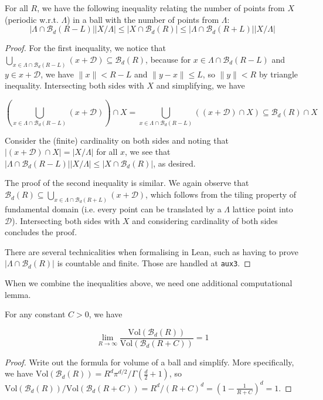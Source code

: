 \begin{lemma}\label{lemma:periodic-points-bounds}\leanok
  For all $R$, we have the following inequality relating the number of points from $X$ (periodic w.r.t. $\Lambda$) in a ball with the number of points from $\Lambda$:
  \[
    \left|\Lambda \cap \mathcal{B}_d(R - L)\right|\left|X / \Lambda\right|
    \leq \left|X \cap \mathcal{B}_d(R)\right|
    \leq \left|\Lambda \cap \mathcal{B}_d(R + L)\right|\left|X / \Lambda\right|
  \]
\end{lemma}
\begin{proof}\leanok
  For the first inequality, we notice that $\bigcup_{x \in \Lambda \cap \mathcal{B}_d(R - L)} (x + \mathcal{D}) \subseteq \mathcal{B}_d(R)$, because for $x \in \Lambda \cap \mathcal{B}_d(R - L)$ and $y \in x + \mathcal{D}$, we have $\|x\| < R - L$ and $\|y - x\| \leq L$, so $\|y\| < R$ by triangle inequality. Intersecting both sides with $X$ and simplifying, we have

  \[
    \left(\bigcup_{x \in \Lambda \cap \mathcal{B}_d(R - L)} (x + \mathcal{D})\right) \cap X = \bigcup_{x \in \Lambda \cap \mathcal{B}_d(R - L)} ((x + \mathcal{D}) \cap X) \subseteq \mathcal{B}_d(R) \cap X
  \]

  Consider the (finite) cardinality on both sides and noting that $|(x + \mathcal{D}) \cap X| = |X / \Lambda|$ for all $x$, we see that $|\Lambda \cap \mathcal{B}_d(R - L)||X / \Lambda| \leq |X \cap \mathcal{B}_d(R)|$, as desired.

  The proof of the second inequality is similar. We again observe that $\mathcal{B}_d(R) \subseteq \bigcup_{x \in \Lambda \cap \mathcal{B}_d(R + L)} (x + \mathcal{D})$, which follows from the tiling property of fundamental domain (i.e. every point can be translated by a $\Lambda$ lattice point into $\mathcal{D}$). Intersecting both sides with $X$ and considering cardinality of both sides concludes the proof.

  There are several technicalities when formalising in Lean, such as having to prove $|\Lambda \cap \mathcal{B}_d(R)|$ is countable and finite. Those are handled at \texttt{aux3}.
\end{proof}

When we combine the inequalities above, we need one additional computational lemma.

\begin{lemma}\label{lemma:volume-ball-ratio-limit}\leanok
  For any constant $C > 0$, we have

  \[
    \lim_{R \to \infty} \frac{\mathrm{Vol}(\mathcal{B}_d(R))}{\mathrm{Vol}(\mathcal{B}_d(R + C))} = 1
  \]
\end{lemma}
\begin{proof}
  Write out the formula for volume of a ball and simplify. More specifically, we have $\mathrm{Vol}(\mathcal{B}_d(R)) = R^d \pi^{d / 2} / \Gamma\left(\frac{d}{2} + 1\right)$, so $\mathrm{Vol}(\mathcal{B}_d(R)) / \mathrm{Vol}(\mathcal{B}_d(R + C)) = R^d / (R + C)^d = \left(1 - \frac{1}{R + C}\right)^d = 1$.
\end{proof}

